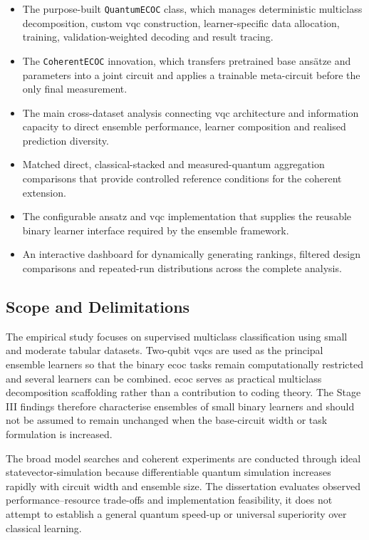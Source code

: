 \documentclass[]{UCD_CS_MSc_AAI_Report}
\begin{document}
\begin{itemize}
    \item The purpose-built \texttt{QuantumECOC} class, which manages deterministic multiclass decomposition, custom \ac{vqc} construction, learner-specific data allocation, training, validation-weighted decoding and result tracing.
    \item The \texttt{CoherentECOC} innovation, which transfers pretrained base ansätze and parameters into a joint circuit and applies a trainable meta-circuit before the only final measurement.
    \item The main cross-dataset analysis connecting \ac{vqc} architecture and information capacity to direct ensemble performance, learner composition and realised prediction diversity.
    \item Matched direct, classical-stacked and measured-quantum aggregation comparisons that provide controlled reference conditions for the coherent extension.
    \item The configurable ansatz and \ac{vqc} implementation that supplies the reusable binary learner interface required by the ensemble framework.
    \item An interactive dashboard for dynamically generating rankings, filtered design comparisons and repeated-run distributions across the complete analysis.
\end{itemize}

\subsection{Scope and Delimitations}

The empirical study focuses on supervised multiclass classification using small and moderate tabular datasets. Two-qubit \acp{vqc} are used as the principal ensemble learners so that the binary \ac{ecoc} tasks remain computationally restricted and several learners can be combined. \ac{ecoc} serves as practical multiclass decomposition scaffolding rather than a contribution to coding theory. The Stage III findings therefore characterise ensembles of small binary learners and should not be assumed to remain unchanged when the base-circuit width or task formulation is increased.

The broad model searches and coherent experiments are conducted through ideal \gls{statevector-simulation} because differentiable quantum simulation increases rapidly with circuit width and ensemble size. The dissertation evaluates observed performance--resource trade-offs and implementation feasibility, it does not attempt to establish a general quantum speed-up or universal superiority over classical learning.
\end{document}
